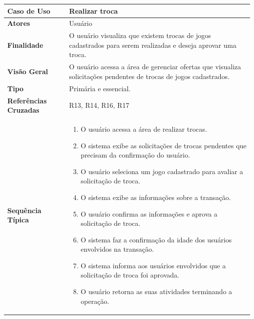 \documentclass[a4paper,11pt]{article}
\begin{document}
\begin{table}[H]
		\begin{tabularx}{\textwidth}{|l|X|}
		\hline
			\textbf{Caso de Uso} &  Realizar troca \\ \hline
			\textbf{Atores} &  Usuário  \\ \hline
			\textbf{Finalidade} &  O usuário visualiza que existem trocas de jogos cadastrados para serem realizadas e deseja aprovar uma troca.  \\ \hline
			\textbf{Visão Geral} & O usuário acessa a área de gerenciar ofertas que visualiza solicitações pendentes de trocas de jogos cadastrados. \\ \hline
			\textbf{Tipo} & Primária e essencial. \\ \hline
			\textbf{Referências Cruzadas} & R13, R14, R16, R17 \\ \hline
			\textbf{Sequência Típica} & 
			\begin{enumerate}
			\item O usuário acessa a área de realizar trocas.
			\item O sistema exibe as solicitações de trocas pendentes que precisam da confirmação do usuário.
			\item O usuário seleciona um jogo cadastrado para avaliar a solicitação de troca.
			\item O sistema exibe as informações sobre a transação.
			\item O usuário confirma as informações e aprova a solicitação de troca.
			\item O sistema faz a confirmação da idade dos usuários envolvidos na transação.
			\item O sistema informa aos usuários envolvidos que a solicitação de troca foi aprovada.
			\item O usuário retorna as suas atividades terminando a operação.
			\end{enumerate} \\ \hline
			

\end{tabularx}
\end{table}
\end{document}
